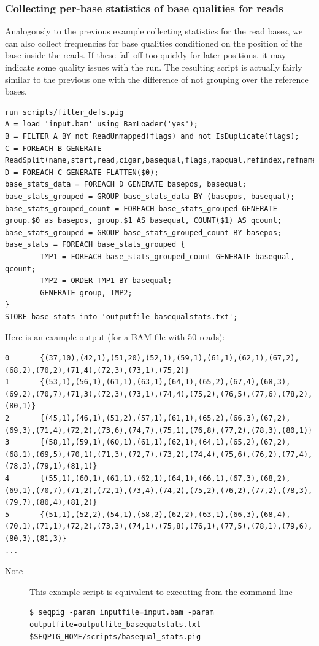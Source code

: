 \subsubsection{Collecting per-base statistics of base qualities for reads}
Analogously to the previous example collecting statistics for the read bases, we can also collect
frequencies for base qualities conditioned on the position of the base inside
the reads. If these fall off too quickly for later positions, it may
indicate some quality issues with the run. The resulting script is actually
fairly similar to the previous one with the difference of not grouping
over the reference bases.
\begin{lstlisting}
run scripts/filter_defs.pig
A = load 'input.bam' using BamLoader('yes');
B = FILTER A BY not ReadUnmapped(flags) and not IsDuplicate(flags);
C = FOREACH B GENERATE ReadSplit(name,start,read,cigar,basequal,flags,mapqual,refindex,refname,attributes#'MD');
D = FOREACH C GENERATE FLATTEN($0);
base_stats_data = FOREACH D GENERATE basepos, basequal;
base_stats_grouped = GROUP base_stats_data BY (basepos, basequal);
base_stats_grouped_count = FOREACH base_stats_grouped GENERATE group.$0 as basepos, group.$1 AS basequal, COUNT($1) AS qcount;
base_stats_grouped = GROUP base_stats_grouped_count BY basepos;
base_stats = FOREACH base_stats_grouped {
        TMP1 = FOREACH base_stats_grouped_count GENERATE basequal, qcount;
        TMP2 = ORDER TMP1 BY basequal;
        GENERATE group, TMP2;
}
STORE base_stats into 'outputfile_basequalstats.txt';
\end{lstlisting}
Here is an example output (for a BAM file with 50 reads):
\begin{lstlisting}
0       {(37,10),(42,1),(51,20),(52,1),(59,1),(61,1),(62,1),(67,2),(68,2),(70,2),(71,4),(72,3),(73,1),(75,2)}
1       {(53,1),(56,1),(61,1),(63,1),(64,1),(65,2),(67,4),(68,3),(69,2),(70,7),(71,3),(72,3),(73,1),(74,4),(75,2),(76,5),(77,6),(78,2),(80,1)}
2       {(45,1),(46,1),(51,2),(57,1),(61,1),(65,2),(66,3),(67,2),(69,3),(71,4),(72,2),(73,6),(74,7),(75,1),(76,8),(77,2),(78,3),(80,1)}
3       {(58,1),(59,1),(60,1),(61,1),(62,1),(64,1),(65,2),(67,2),(68,1),(69,5),(70,1),(71,3),(72,7),(73,2),(74,4),(75,6),(76,2),(77,4),(78,3),(79,1),(81,1)}
4       {(55,1),(60,1),(61,1),(62,1),(64,1),(66,1),(67,3),(68,2),(69,1),(70,7),(71,2),(72,1),(73,4),(74,2),(75,2),(76,2),(77,2),(78,3),(79,7),(80,4),(81,2)}
5       {(51,1),(52,2),(54,1),(58,2),(62,2),(63,1),(66,3),(68,4),(70,1),(71,1),(72,2),(73,3),(74,1),(75,8),(76,1),(77,5),(78,1),(79,6),(80,3),(81,3)}
...
\end{lstlisting}
\begin{description}
	\item[Note] This example script is equivalent to executing from the command line
\begin{lstlisting}
$ seqpig -param inputfile=input.bam -param outputfile=outputfile_basequalstats.txt $SEQPIG_HOME/scripts/basequal_stats.pig
\end{lstlisting}
\end{description}

